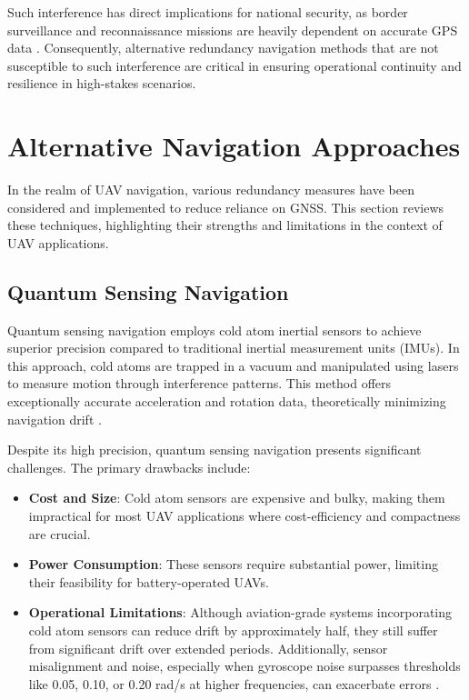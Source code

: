 Such interference has direct implications for national security, as border surveillance and reconnaissance missions are heavily dependent on accurate GPS data \cite{Weiss2024}. Consequently, alternative redundancy navigation methods that are not susceptible to such interference are critical in ensuring operational continuity and resilience in high-stakes scenarios.


\section{Alternative Navigation Approaches}

In the realm of UAV navigation, various redundancy measures have been considered and implemented to reduce reliance on GNSS. This section reviews these techniques, highlighting their strengths and limitations in the context of UAV applications.

\subsection{Quantum Sensing Navigation}

Quantum sensing navigation employs cold atom inertial sensors to achieve superior precision compared to traditional inertial measurement units (IMUs). In this approach, cold atoms are trapped in a vacuum and manipulated using lasers to measure motion through interference patterns. This method offers exceptionally accurate acceleration and rotation data, theoretically minimizing navigation drift \cite{wright2022cold}.

Despite its high precision, quantum sensing navigation presents significant challenges. The primary drawbacks include:

\begin{itemize}
    \item \textbf{Cost and Size}: Cold atom sensors are expensive and bulky, making them impractical for most UAV applications where cost-efficiency and compactness are crucial.
    \item \textbf{Power Consumption}: These sensors require substantial power, limiting their feasibility for battery-operated UAVs.
    \item \textbf{Operational Limitations}: Although aviation-grade systems incorporating cold atom sensors can reduce drift by approximately half, they still suffer from significant drift over extended periods. Additionally, sensor misalignment and noise, especially when gyroscope noise surpasses thresholds like 0.05, 0.10, or 0.20 rad/s at higher frequencies, can exacerbate errors \cite{wright2022cold}.
\end{itemize}

